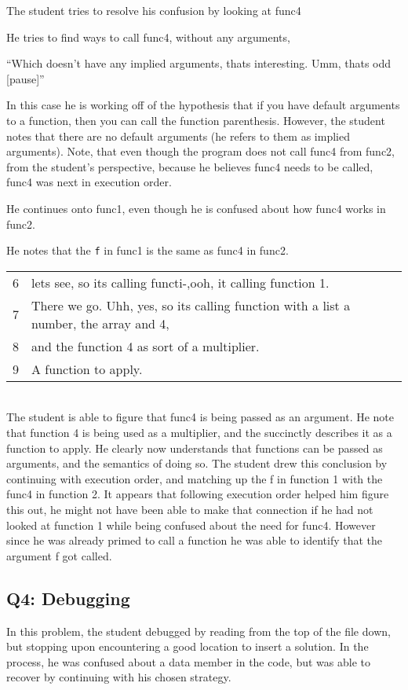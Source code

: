 The student tries to resolve his confusion by looking at func4

He tries to find ways to call func4, without any arguments,

``Which doesn't have any implied arguments, thats interesting. Umm, thats odd [pause]''

In this case he is working off of the hypothesis that if you have default arguments to a function,
  then you can call the function parenthesis.
However, the student notes that there are no default arguments (he refers to them as implied arguments).
Note, that even though the program does not call func4 from func2, from the student's perspective, because he believes func4 needs to be called, func4 was next in execution order.

He continues onto func1, even though he is confused about how func4 works in func2.

He notes that the \texttt{f} in func1 is the same as func4 in func2. \\

\begin{tabular}{lp{13cm}}
6& lets see, so its calling functi-,ooh, it calling function 1.\\
7&There we go. Uhh, yes, so its calling function with a list a number, the array and 4,\\
8&and the function 4 as sort of a multiplier.\\
9&A function to apply. \\
\end{tabular}\\
The student is able to figure that func4 is being passed as an argument.
He note that function 4 is being used as a multiplier, and the succinctly describes it as a function to apply.
He clearly now understands that functions can be passed as arguments, and the semantics of doing so.
The student drew this conclusion by continuing with execution order, and matching up the f in function 1 with the func4 in function 2.
It appears that following execution order helped him figure this out, he might not have been able to make that connection if he had not looked at function 1 while being confused about the need for func4.
However since he was already primed to call a function he was able to identify that the argument f got called.

\newpage
\subsection{Q4: Debugging}
In this problem, the student debugged by reading from the top of the file down, but stopping upon encountering a good location to insert a solution. In the process, he was confused about a data member in the code, but was able to recover by continuing with his chosen strategy. \\

